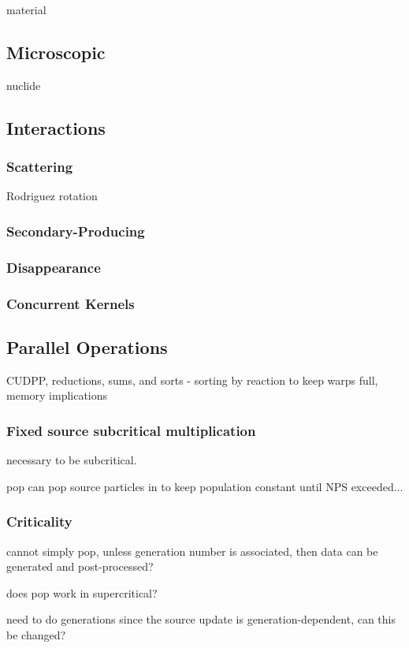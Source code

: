 material

\subsection{Microscopic}

nuclide

\subsection{Interactions}

\subsubsection{Scattering}

Rodriguez rotation

\subsubsection{Secondary-Producing}


\subsubsection{Disappearance}


\subsubsection{Concurrent Kernels}

\subsection{Parallel Operations}

CUDPP, reductions, sums, and sorts - sorting by reaction to keep warps full, memory implications

\subsubsection{Fixed source subcritical multiplication}

necessary to be subcritical.

pop can pop source particles in to keep population constant until NPS exceeded...

\subsubsection{Criticality}

cannot simply pop, unless generation number is associated, then data can be generated and post-processed?

does pop work in supercritical?

need to do generations since the source update is generation-dependent, can this be changed?





